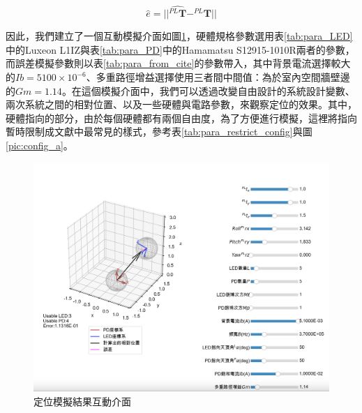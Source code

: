 \begin{equation}
    \label{eqn:error_dis}
    \hat{e} = ||\hat{^{PL}\boldsymbol{T}}-^{PL}\boldsymbol{T}||
\end{equation}





因此，我們建立了一個互動模擬介面如圖\ref{pic:result_interactive}，硬體規格參數選用表\ref{tab:para_LED}中的Luxeon L1IZ與表\ref{tab:para_PD}中的Hamamatsu S12915-1010R兩者的參數，而誤差模擬參數則以表\ref{tab:para_from_cite}的參數帶入，其中背景電流選擇較大的$Ib = 5100\times 10^{-6}$、多重路徑增益選擇使用三者間中間值：為於室內空間牆壁邊的$Gm=1.14$。在這個模擬介面中，我們可以透過改變自由設計的系統設計變數、兩次系統之間的相對位置、以及一些硬體與電路參數，來觀察定位的效果。其中，硬體指向的部分，由於每個硬體都有兩個自由度，為了方便進行模擬，這裡將指向暫時限制成文獻中最常見的樣式，參考表\ref{tab:para_restrict_config}與圖\ref{pic:config_a}。



\begin{figure}[htpb]
    \centering
    \includegraphics[width=15cm]{ch4pic/interactive_1to1.png}
    \caption{定位模擬結果互動介面}
    \label{pic:result_interactive}
\end{figure}



